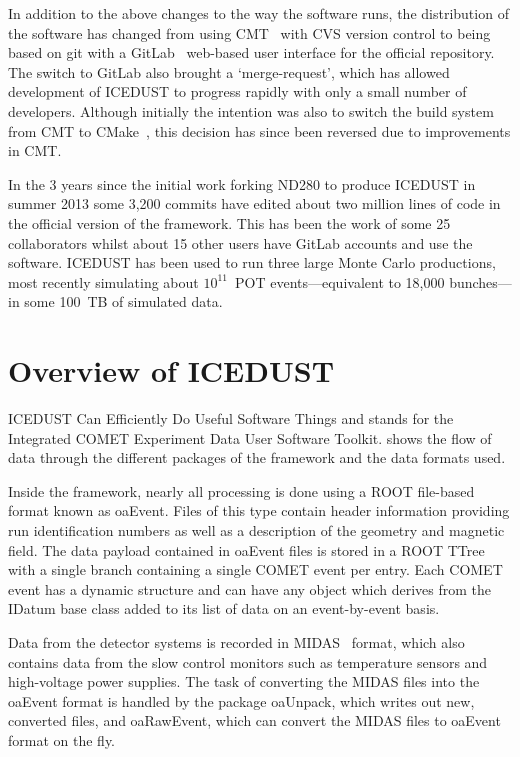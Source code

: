 In addition to the above changes to the way the software runs, the distribution of the software has changed from using CMT~\cite{cmt} with CVS version control to being based on git with a GitLab~\cite{GitLab} web-based user interface for the official repository.
The switch to GitLab also brought a `merge-request', which has allowed development of ICEDUST to progress rapidly with only a small number of developers.
Although initially the intention was also to switch the build system from CMT to CMake~\cite{cmake}, this decision has since been reversed due to improvements in CMT.

In the 3 years since the initial work forking ND280 to produce ICEDUST in summer 2013 some 3,200 commits have edited about two million lines of code in the official version of the framework.
This has been the work of some 25 collaborators whilst about 15 other users have GitLab accounts and use the software.
ICEDUST has been used to run three large Monte Carlo productions, most recently simulating about $10^{11}$~\ac{POT} events---equivalent to 18,000 \phaseI bunches---in some 100~TB of simulated data.

\section{Overview of ICEDUST}
ICEDUST Can Efficiently Do Useful Software Things and stands for the Integrated COMET Experiment Data User Software Toolkit.
 shows the flow of data through the different packages of the framework and the data formats used.

\FigICEDUSTOverview

Inside the framework, nearly all processing is done using a ROOT file-based format known as oaEvent.  
Files of this type contain header information providing run identification numbers as well as a description of the geometry and magnetic field.  
The data payload contained in oaEvent files is stored in a ROOT TTree with a single branch containing a single COMET event per entry.
Each COMET event has a dynamic structure and can have any object which derives from the IDatum base class added to its list of data on an event-by-event basis.

Data from the detector systems is recorded in MIDAS~\cite{MIDAS} format, which also contains data from the slow control monitors such as temperature sensors and high-voltage power supplies.
The task of converting the MIDAS files into the oaEvent format is handled by the package oaUnpack, which writes out new, converted files, and oaRawEvent, which can convert the MIDAS files to oaEvent format on the fly.

